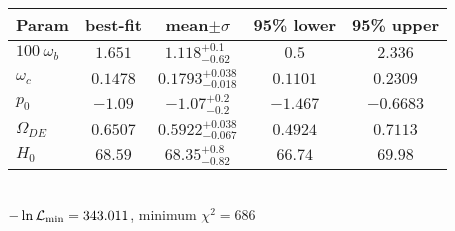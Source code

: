 \begin{tabular}{|l|c|c|c|c|} 
 \hline 
Param & best-fit & mean$\pm\sigma$ & 95\% lower & 95\% upper \\ \hline 
$100~\omega_{b }$ &$1.651$ & $1.118_{-0.62}^{+0.1}$ & $0.5$ & $2.336$ \\ 
$\omega_c$ &$0.1478$ & $0.1793_{-0.018}^{+0.038}$ & $0.1101$ & $0.2309$ \\ 
$p_{0 }$ &$-1.09$ & $-1.07_{-0.2}^{+0.2}$ & $-1.467$ & $-0.6683$ \\ 
$\Omega_{DE}$ &$0.6507$ & $0.5922_{-0.067}^{+0.038}$ & $0.4924$ & $0.7113$ \\ 
$H_{0 }$ &$68.59$ & $68.35_{-0.82}^{+0.8}$ & $66.74$ & $69.98$ \\ 
\hline 
 \end{tabular} \\ 
$-\ln{\cal L}_\mathrm{min} =343.011$, minimum $\chi^2=686$ \\ 

